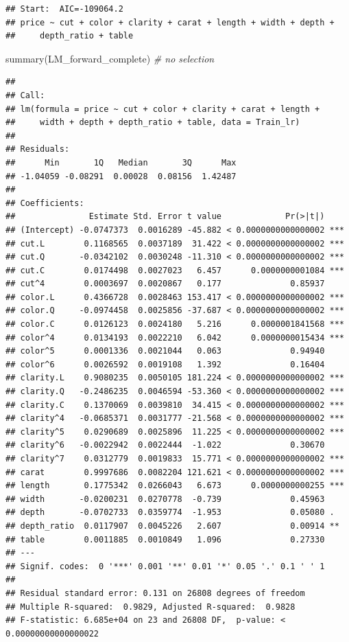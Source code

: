 \documentclass[
]{article}
\newenvironment{Shaded}{\begin{snugshade}}{\end{snugshade}}
\newcommand{\CommentTok}[1]{\textcolor[rgb]{0.56,0.35,0.01}{\textit{#1}}}
\newcommand{\FunctionTok}[1]{\textcolor[rgb]{0.00,0.00,0.00}{#1}}
\newcommand{\NormalTok}[1]{#1}
\begin{document}
\begin{verbatim}
## Start:  AIC=-109064.2
## price ~ cut + color + clarity + carat + length + width + depth +
##     depth_ratio + table
\end{verbatim}

\begin{Shaded}
\begin{Highlighting}[]
\FunctionTok{summary}\NormalTok{(LM\_forward\_complete)    }\CommentTok{\# no selection}
\end{Highlighting}
\end{Shaded}

\begin{verbatim}
##
## Call:
## lm(formula = price ~ cut + color + clarity + carat + length +
##     width + depth + depth_ratio + table, data = Train_lr)
##
## Residuals:
##      Min       1Q   Median       3Q      Max
## -1.04059 -0.08291  0.00028  0.08156  1.42487
##
## Coefficients:
##               Estimate Std. Error t value             Pr(>|t|)
## (Intercept) -0.0747373  0.0016289 -45.882 < 0.0000000000000002 ***
## cut.L        0.1168565  0.0037189  31.422 < 0.0000000000000002 ***
## cut.Q       -0.0342102  0.0030248 -11.310 < 0.0000000000000002 ***
## cut.C        0.0174498  0.0027023   6.457      0.0000000001084 ***
## cut^4        0.0003697  0.0020867   0.177              0.85937
## color.L      0.4366728  0.0028463 153.417 < 0.0000000000000002 ***
## color.Q     -0.0974458  0.0025856 -37.687 < 0.0000000000000002 ***
## color.C      0.0126123  0.0024180   5.216      0.0000001841568 ***
## color^4      0.0134193  0.0022210   6.042      0.0000000015434 ***
## color^5      0.0001336  0.0021044   0.063              0.94940
## color^6      0.0026592  0.0019108   1.392              0.16404
## clarity.L    0.9080235  0.0050105 181.224 < 0.0000000000000002 ***
## clarity.Q   -0.2486235  0.0046594 -53.360 < 0.0000000000000002 ***
## clarity.C    0.1370069  0.0039810  34.415 < 0.0000000000000002 ***
## clarity^4   -0.0685371  0.0031777 -21.568 < 0.0000000000000002 ***
## clarity^5    0.0290689  0.0025896  11.225 < 0.0000000000000002 ***
## clarity^6   -0.0022942  0.0022444  -1.022              0.30670
## clarity^7    0.0312779  0.0019833  15.771 < 0.0000000000000002 ***
## carat        0.9997686  0.0082204 121.621 < 0.0000000000000002 ***
## length       0.1775342  0.0266043   6.673      0.0000000000255 ***
## width       -0.0200231  0.0270778  -0.739              0.45963
## depth       -0.0702733  0.0359774  -1.953              0.05080 .
## depth_ratio  0.0117907  0.0045226   2.607              0.00914 **
## table        0.0011885  0.0010849   1.096              0.27330
## ---
## Signif. codes:  0 '***' 0.001 '**' 0.01 '*' 0.05 '.' 0.1 ' ' 1
##
## Residual standard error: 0.131 on 26808 degrees of freedom
## Multiple R-squared:  0.9829, Adjusted R-squared:  0.9828
## F-statistic: 6.685e+04 on 23 and 26808 DF,  p-value: < 0.00000000000000022
\end{verbatim}
\end{document}
